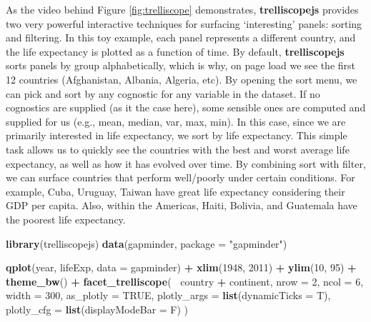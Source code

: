 \documentclass[
  12pt,
]{krantz}
\newenvironment{Shaded}{\begin{snugshade}}{\end{snugshade}}
\newcommand{\DataTypeTok}[1]{\textcolor[rgb]{0.13,0.29,0.53}{#1}}
\newcommand{\DecValTok}[1]{\textcolor[rgb]{0.00,0.00,0.81}{#1}}
\newcommand{\KeywordTok}[1]{\textcolor[rgb]{0.13,0.29,0.53}{\textbf{#1}}}
\newcommand{\NormalTok}[1]{#1}
\newcommand{\OperatorTok}[1]{\textcolor[rgb]{0.81,0.36,0.00}{\textbf{#1}}}
\newcommand{\OtherTok}[1]{\textcolor[rgb]{0.56,0.35,0.01}{#1}}
\newcommand{\StringTok}[1]{\textcolor[rgb]{0.31,0.60,0.02}{#1}}
\begin{document}
As the video behind Figure \ref{fig:trelliscope} demonstrates, \textbf{trelliscopejs} provides two very powerful interactive techniques for surfacing `interesting' panels: sorting and filtering. In this toy example, each panel represents a different country, and the life expectancy is plotted as a function of time. By default, \textbf{trelliscopejs} sorts panels by group alphabetically, which is why, on page load we see the first 12 countries (Afghanistan, Albania, Algeria, etc). By opening the sort menu, we can pick and sort by any cognostic for any variable in the dataset. If no cognostics are supplied (as it the case here), some sensible ones are computed and supplied for us (e.g., mean, median, var, max, min). In this case, since we are primarily interested in life expectancy, we sort by life expectancy. This simple task allows us to quickly see the countries with the best and worst average life expectancy, as well as how it has evolved over time. By combining sort with filter, we can surface countries that perform well/poorly under certain conditions. For example, Cuba, Uruguay, Taiwan have great life expectancy considering their GDP per capita. Also, within the Americas, Haiti, Bolivia, and Guatemala have the poorest life expectancy.

\begin{Shaded}
\begin{Highlighting}[]
\KeywordTok{library}\NormalTok{(trelliscopejs)}
\KeywordTok{data}\NormalTok{(gapminder, }\DataTypeTok{package =} \StringTok{"gapminder"}\NormalTok{)}

\KeywordTok{qplot}\NormalTok{(year, lifeExp, }\DataTypeTok{data =}\NormalTok{ gapminder) }\OperatorTok{+}
\StringTok{  }\KeywordTok{xlim}\NormalTok{(}\DecValTok{1948}\NormalTok{, }\DecValTok{2011}\NormalTok{) }\OperatorTok{+}\StringTok{ }\KeywordTok{ylim}\NormalTok{(}\DecValTok{10}\NormalTok{, }\DecValTok{95}\NormalTok{) }\OperatorTok{+}\StringTok{ }\KeywordTok{theme_bw}\NormalTok{() }\OperatorTok{+}
\StringTok{  }\KeywordTok{facet_trelliscope}\NormalTok{(}\OperatorTok{~}\StringTok{ }\NormalTok{country }\OperatorTok{+}\StringTok{ }\NormalTok{continent,}
    \DataTypeTok{nrow =} \DecValTok{2}\NormalTok{, }\DataTypeTok{ncol =} \DecValTok{6}\NormalTok{, }\DataTypeTok{width =} \DecValTok{300}\NormalTok{, }
    \DataTypeTok{as_plotly =} \OtherTok{TRUE}\NormalTok{, }
    \DataTypeTok{plotly_args =} \KeywordTok{list}\NormalTok{(}\DataTypeTok{dynamicTicks =}\NormalTok{ T),}
    \DataTypeTok{plotly_cfg =} \KeywordTok{list}\NormalTok{(}\DataTypeTok{displayModeBar =}\NormalTok{ F)}
\NormalTok{  )}
\end{Highlighting}
\end{Shaded}
\end{document}
